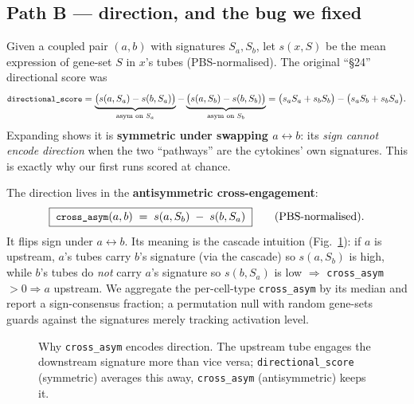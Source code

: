 \documentclass[11pt]{article}
\newcommand{\code}[1]{\texttt{\small #1}}
\newcommand{\cross}{\code{cross\_asym}}
\newcommand{\dscore}{\code{directional\_score}}
\begin{document}
\subsection{Path B --- direction, and the bug we fixed}\label{sec:pathb}
Given a coupled pair $(a,b)$ with signatures $S_a,S_b$, let $s(x,S)$ be the mean
expression of gene-set $S$ in $x$'s tubes (PBS-normalised). The original ``§24''
directional score was
\begin{equation}
\dscore = \underbrace{\big(s(a,S_a)-s(b,S_a)\big)}_{\text{asym on }S_a}
         -\underbrace{\big(s(a,S_b)-s(b,S_b)\big)}_{\text{asym on }S_b}
        = \big(s_aS_a+s_bS_b\big)-\big(s_aS_b+s_bS_a\big).
\end{equation}
Expanding shows it is \textbf{symmetric under swapping $a\leftrightarrow b$}: its
\emph{sign cannot encode direction} when the two ``pathways'' are the cytokines'
own signatures. This is exactly why our first runs scored at chance.

The direction lives in the \textbf{antisymmetric cross-engagement}:
\begin{equation}\label{eq:cross}
\boxed{\;\cross(a,b) \;=\; s(a,S_b)\;-\;s(b,S_a)\;}
\qquad\text{(PBS-normalised)}.
\end{equation}
It flips sign under $a\leftrightarrow b$. Its meaning is the cascade intuition
(Fig.~\ref{fig:f8}): if $a$ is upstream, $a$'s tubes carry $b$'s signature (via the
cascade) so $s(a,S_b)$ is high, while $b$'s tubes do \emph{not} carry $a$'s
signature so $s(b,S_a)$ is low $\Rightarrow$ \cross{}\,$>0\Rightarrow a$ upstream.
We aggregate the per-cell-type \cross{} by its median and report a sign-consensus
fraction; a permutation null with random gene-sets guards against the signatures
merely tracking activation level.

\begin{figure}[h]\centering
{}
\caption{Why \cross{} encodes direction. The upstream tube engages the downstream
signature more than vice versa; \dscore{} (symmetric) averages this away,
\cross{} (antisymmetric) keeps it.}\label{fig:f8}
\end{figure}
\end{document}
